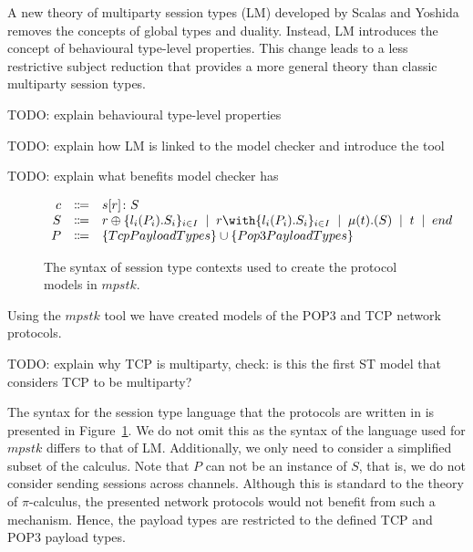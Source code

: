 \documentclass{article}
\newcommand{\todo}[1]{}
\renewcommand{\todo}[1]{{\color{red} TODO: {#1}}}
\newcommand{\sep}{\;\mid\;}
\begin{document}
A new theory of multiparty session types (LM) developed by Scalas and Yoshida~\cite{SY19} removes the concepts of global types and duality.
Instead, LM introduces the concept of behavioural type-level properties.
This change leads to a less restrictive subject reduction that provides a more general theory than classic multiparty session types.

\todo{explain behavioural type-level properties}

\todo{explain how LM is linked to the model checker and introduce the tool}

\todo{explain what benefits model checker has}


\begin{figure}[H]
    \centering
        $
        \begin{array}{rcl}
        \ensuremath{c}
            & \Coloneqq & \ensuremath{s[r] \colon S} \cr
        \ensuremath{S}
            & \Coloneqq & \ensuremath{r \oplus \{l_i(P_i).S_i\}_{i \in I}}
            \sep        \ensuremath{r \with \{l_i(P_i).S_i\}_{i \in I}}
            \sep        \ensuremath{\mu(t).(S)}
            \sep        \ensuremath{t}
            \sep        \ensuremath{end} \cr
        \ensuremath{P}
            & \Coloneqq & \ensuremath{\{TcpPayloadTypes\} \cup \{Pop3PayloadTypes\}}
        \end{array}
        $
    \caption{The syntax of session type contexts used to create the protocol models in \ensuremath{mpstk}.}
    \label{fig:syntax}
\end{figure}

Using the \ensuremath{mpstk} tool we have created models of the POP3 and TCP network protocols.

\todo{explain why TCP is multiparty, check: is this the first ST model that considers TCP to be multiparty?}

The syntax for the session type language that the protocols are written in is presented in Figure~\ref{fig:syntax}.
We do not omit this as the syntax of the language used for \ensuremath{mpstk} differs to that of LM.
Additionally, we only need to consider a simplified subset of the calculus.
Note that \ensuremath{P} can not be an instance of \ensuremath{S}, that is, we do not consider sending sessions across channels.
Although this is standard to the theory of \ensuremath{\pi}-calculus, the presented network protocols would not benefit from such a mechanism.
Hence, the payload types are restricted to the defined TCP and POP3 payload types.

\medskip
\nocite{*}
\printbibliography
\end{document}
